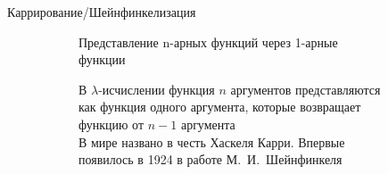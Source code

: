 \begin{frame}{Каррирование/Шейнфинкелизация}
\begin{figure}[t]
  \begin{subfigure}[t]{0.4 \textwidth}
        \vspace{-10em}
\begin{definition}%
Представление n-арных функций через 1-арные функции
\end{definition}

\vspace{1em}

В $\lambda$-исчислении функция $n$ аргументов представляются как функция одного аргумента, которые возвращает функцию от $n-1$ аргумента\\

В мире названо в честь Хаскеля Карри. Впервые появилось в 1924 в работе М.~И.~Шейнфинкеля\\



\end{subfigure}
\end{figure}
\end{frame}
